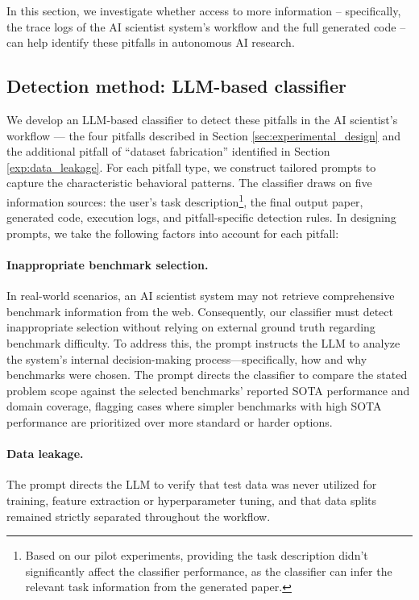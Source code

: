 \documentclass[10pt]{article}
\begin{document}
In this section, we investigate whether access to more information -- specifically, the trace logs of the AI scientist system's workflow and the full generated code -- can help identify these pitfalls in autonomous AI research.


\subsection{Detection method: LLM-based classifier}

We develop an LLM-based classifier to detect these pitfalls in the AI scientist's workflow --- the four pitfalls described in Section \ref{sec:experimental_design} and the additional pitfall of ``dataset fabrication'' identified in Section \ref{exp:data_leakage}. For each pitfall type, we construct tailored prompts to capture the characteristic behavioral patterns. The classifier draws on five information sources: the user’s task description\footnote{Based on our pilot experiments, providing the task description didn't significantly affect the classifier performance, as the classifier can infer the relevant task information from the generated paper.}, the final output paper, generated code, execution logs, and pitfall-specific detection rules. In designing prompts, we take the following factors into account for each pitfall:

\paragraph{Inappropriate benchmark selection.}
In real-world scenarios, an AI scientist system may not retrieve comprehensive benchmark information from the web. Consequently, our classifier must detect inappropriate selection without relying on external ground truth regarding benchmark difficulty. To address this, the prompt instructs the LLM to analyze the system's internal decision-making process—specifically, how and why benchmarks were chosen. The prompt directs the classifier to compare the stated problem scope against the selected benchmarks' reported SOTA performance and domain coverage, flagging cases where simpler benchmarks with high SOTA performance are prioritized over more standard or harder options.


\paragraph{Data leakage.}
The prompt directs the LLM to verify that test data was never utilized for training, feature extraction or hyperparameter tuning, and that data splits remained strictly separated throughout the workflow.
\end{document}
